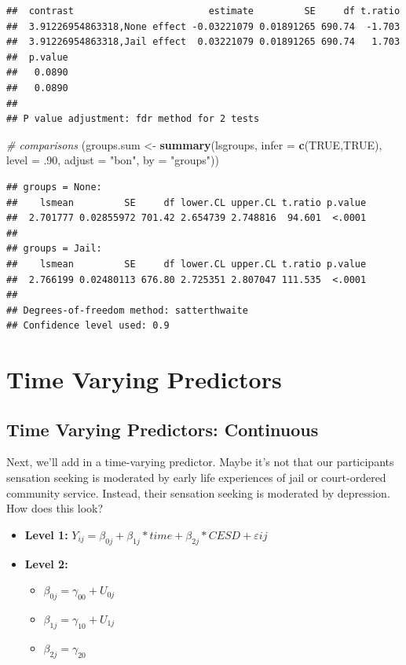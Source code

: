 \documentclass[]{article}
\newenvironment{Shaded}{\begin{snugshade}}{\end{snugshade}}
\newcommand{\KeywordTok}[1]{\textcolor[rgb]{0.13,0.29,0.53}{\textbf{#1}}}
\newcommand{\DataTypeTok}[1]{\textcolor[rgb]{0.13,0.29,0.53}{#1}}
\newcommand{\DecValTok}[1]{\textcolor[rgb]{0.00,0.00,0.81}{#1}}
\newcommand{\StringTok}[1]{\textcolor[rgb]{0.31,0.60,0.02}{#1}}
\newcommand{\CommentTok}[1]{\textcolor[rgb]{0.56,0.35,0.01}{\textit{#1}}}
\newcommand{\OtherTok}[1]{\textcolor[rgb]{0.56,0.35,0.01}{#1}}
\newcommand{\NormalTok}[1]{#1}
\begin{document}
\begin{verbatim}
##  contrast                        estimate         SE     df t.ratio
##  3.91226954863318,None effect -0.03221079 0.01891265 690.74  -1.703
##  3.91226954863318,Jail effect  0.03221079 0.01891265 690.74   1.703
##  p.value
##   0.0890
##   0.0890
## 
## P value adjustment: fdr method for 2 tests
\end{verbatim}

\begin{Shaded}
\begin{Highlighting}[]
\CommentTok{# comparisons}
\NormalTok{(groups.sum <-}\StringTok{ }\KeywordTok{summary}\NormalTok{(lsgroups, }\DataTypeTok{infer =} \KeywordTok{c}\NormalTok{(}\OtherTok{TRUE}\NormalTok{,}\OtherTok{TRUE}\NormalTok{), }
          \DataTypeTok{level =}\NormalTok{ .}\DecValTok{90}\NormalTok{, }\DataTypeTok{adjust =} \StringTok{"bon"}\NormalTok{, }\DataTypeTok{by =} \StringTok{"groups"}\NormalTok{))}
\end{Highlighting}
\end{Shaded}

\begin{verbatim}
## groups = None:
##    lsmean         SE     df lower.CL upper.CL t.ratio p.value
##  2.701777 0.02855972 701.42 2.654739 2.748816  94.601  <.0001
## 
## groups = Jail:
##    lsmean         SE     df lower.CL upper.CL t.ratio p.value
##  2.766199 0.02480113 676.80 2.725351 2.807047 111.535  <.0001
## 
## Degrees-of-freedom method: satterthwaite 
## Confidence level used: 0.9
\end{verbatim}

\section{Time Varying Predictors}\label{time-varying-predictors}

\subsection{Time Varying Predictors:
Continuous}\label{time-varying-predictors-continuous}

Next, we'll add in a time-varying predictor. Maybe it's not that our
participants sensation seeking is moderated by early life experiences of
jail or court-ordered community service. Instead, their sensation
seeking is moderated by depression.\\
How does this look?

\begin{itemize}
  \item \textbf{Level 1:} $Y_{ij} = \beta_{0j} + \beta_{1j}*time + \beta_{2j}*CESD + \varepsilon{ij}$
  \item \textbf{Level 2:} 
    \begin{itemize} 
      \item $\beta_{0j} = \gamma_{00} + U_{0j}$
      \item $\beta_{1j} = \gamma_{10} + U_{1j}$
      \item $\beta_{2j} = \gamma_{20}$
    \end{itemize}
\end{itemize}
\end{document}
